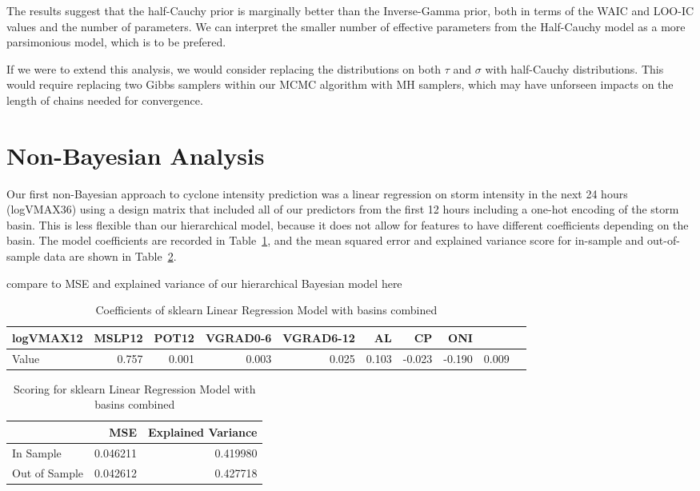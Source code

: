 \documentclass[12pt]{article}
\begin{document}
The results suggest that the half-Cauchy prior is marginally better than the Inverse-Gamma prior, both in terms of the WAIC and LOO-IC values and the number of parameters. We can interpret the smaller number of effective parameters from the Half-Cauchy model as a more parsimonious model, which is to be prefered. %

If we were to extend this analysis, we would consider replacing the distributions on both $\tau$ and $\sigma$ with half-Cauchy distributions. This would require replacing two Gibbs samplers within our MCMC algorithm with MH samplers, which may have unforseen impacts on the length of chains needed for convergence.

\section{Non-Bayesian Analysis}
Our first non-Bayesian approach to cyclone intensity prediction was a linear regression on storm intensity in the next 24 hours (logVMAX36) using a design matrix that included all of our predictors from the first 12 hours including a one-hot encoding of the storm basin. This is less flexible than our hierarchical model, because it does not allow for features to have different coefficients depending on the basin. The model coefficients are recorded in Table~\ref{tab:reg_coefs}, and the mean squared error and explained variance score for in-sample and out-of-sample data are shown in Table~\ref{tab:reg_scoring}. 

compare to MSE and explained variance of our hierarchical Bayesian model here

\begin{table}[h]
\centering
\caption{Coefficients of sklearn Linear Regression Model with basins combined}
\label{tab:reg_coefs}
\begin{tabular}{lrrrrrrrrr}
\toprule
 logVMAX12 & MSLP12 & POT12 & VGRAD0-6 & VGRAD6-12 & AL & CP & ONI \\
\midrule
Value & 0.757 & 0.001 & 0.003 & 0.025 & 0.103 & -0.023 & -0.190 & 0.009 \\
\bottomrule
\end{tabular}
\end{table}

\begin{table}[h]
\centering
\caption{Scoring for sklearn Linear Regression Model with basins combined}
\label{tab:reg_scoring}
\begin{tabular}{lrr}
\toprule
 & MSE & Explained Variance \\
\midrule
In Sample & 0.046211 & 0.419980 \\
Out of Sample & 0.042612 & 0.427718 \\
\bottomrule
\end{tabular}
\end{table}
\end{document}
